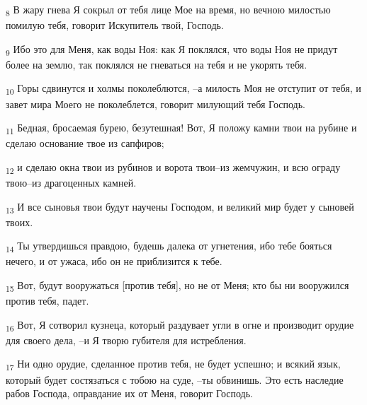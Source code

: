 \begin{tcolorbox}
\textsubscript{8} В жару гнева Я сокрыл от тебя лице Мое на время, но вечною милостью помилую тебя, говорит Искупитель твой, Господь.
\end{tcolorbox}
\begin{tcolorbox}
\textsubscript{9} Ибо это для Меня, как воды Ноя: как Я поклялся, что воды Ноя не придут более на землю, так поклялся не гневаться на тебя и не укорять тебя.
\end{tcolorbox}
\begin{tcolorbox}
\textsubscript{10} Горы сдвинутся и холмы поколеблются, --а милость Моя не отступит от тебя, и завет мира Моего не поколеблется, говорит милующий тебя Господь.
\end{tcolorbox}
\begin{tcolorbox}
\textsubscript{11} Бедная, бросаемая бурею, безутешная! Вот, Я положу камни твои на рубине и сделаю основание твое из сапфиров;
\end{tcolorbox}
\begin{tcolorbox}
\textsubscript{12} и сделаю окна твои из рубинов и ворота твои--из жемчужин, и всю ограду твою--из драгоценных камней.
\end{tcolorbox}
\begin{tcolorbox}
\textsubscript{13} И все сыновья твои будут научены Господом, и великий мир будет у сыновей твоих.
\end{tcolorbox}
\begin{tcolorbox}
\textsubscript{14} Ты утвердишься правдою, будешь далека от угнетения, ибо тебе бояться нечего, и от ужаса, ибо он не приблизится к тебе.
\end{tcolorbox}
\begin{tcolorbox}
\textsubscript{15} Вот, будут вооружаться [против тебя], но не от Меня; кто бы ни вооружился против тебя, падет.
\end{tcolorbox}
\begin{tcolorbox}
\textsubscript{16} Вот, Я сотворил кузнеца, который раздувает угли в огне и производит орудие для своего дела, --и Я творю губителя для истребления.
\end{tcolorbox}
\begin{tcolorbox}
\textsubscript{17} Ни одно орудие, сделанное против тебя, не будет успешно; и всякий язык, который будет состязаться с тобою на суде, --ты обвинишь. Это есть наследие рабов Господа, оправдание их от Меня, говорит Господь.
\end{tcolorbox}
